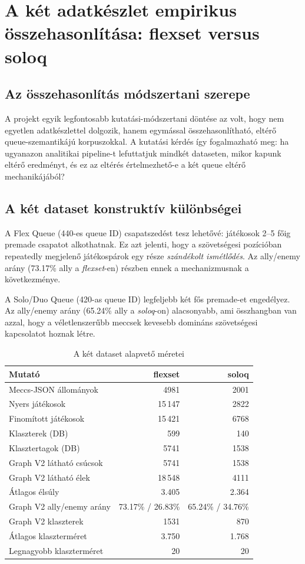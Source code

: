 \chapter{A két adatkészlet empirikus összehasonlítása: flexset versus soloq}

\section{Az összehasonlítás módszertani szerepe}

A projekt egyik legfontosabb kutatási-módszertani döntése az volt, hogy nem egyetlen adatkészlettel dolgozik, hanem egymással összehasonlítható, eltérő queue-szemantikájú korpuszokkal. A kutatási kérdés így fogalmazható meg: ha ugyanazon analitikai pipeline-t lefuttatjuk mindkét dataseten, mikor kapunk eltérő eredményt, és ez az eltérés értelmezhető-e a két queue eltérő mechanikájából?

\section{A két dataset konstruktív különbségei}

A Flex Queue (440-es queue ID) csapatszedést tesz lehetővé: játékosok 2--5 főig premade csapatot alkothatnak. Ez azt jelenti, hogy a szövetségesi pozícióban repeatedly megjelenő játékospárok egy része \emph{szándékolt ismétlődés}. Az ally/enemy arány (73.17\% ally a \textit{flexset}-en) részben ennek a mechanizmusnak a következménye.

A Solo/Duo Queue (420-as queue ID) legfeljebb két fős premade-et engedélyez. Az ally/enemy arány (65.24\% ally a \textit{soloq}-on) alacsonyabb, ami összhangban van azzal, hogy a véletlenszerűbb meccsek kevesebb domináns szövetségesi kapcsolatot hoznak létre.

\begin{table}[H]
\centering
\caption{A két dataset alapvető méretei}
\begin{tabularx}{\textwidth}{>{\raggedright\arraybackslash}p{5cm} rr}
\toprule
\textbf{Mutató} & \textbf{flexset} & \textbf{soloq} \\
\midrule
Meccs-JSON állományok & 4981 & 2001 \\
Nyers játékosok & 15\,147 & 2822 \\
Finomított játékosok & 15\,421 & 6768 \\
Klaszterek (DB) & 599 & 140 \\
Klasztertagok (DB) & 5741 & 1538 \\
Graph V2 látható csúcsok & 5741 & 1538 \\
Graph V2 látható élek & 18\,548 & 4111 \\
Átlagos élsúly & 3.405 & 2.364 \\
Graph V2 ally/enemy arány & 73.17\% / 26.83\% & 65.24\% / 34.76\% \\
Graph V2 klaszterek & 1531 & 870 \\
Átlagos klaszterméret & 3.750 & 1.768 \\
Legnagyobb klaszterméret & 20 & 20 \\
\bottomrule
\end{tabularx}
\end{table}

